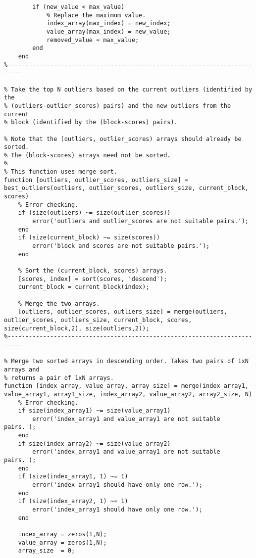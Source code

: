 \begin{lstlisting}
        if (new_value < max_value)
            % Replace the maximum value.
            index_array(max_index) = new_index;
            value_array(max_index) = new_value;
            removed_value = max_value;
        end
    end
%--------------------------------------------------------------------------

% Take the top N outliers based on the current outliers (identified by the
% (outliers-outlier_scores) pairs) and the new outliers from the current
% block (identified by the (block-scores) pairs).

% Note that the (outliers, outlier_scores) arrays should already be sorted.
% The (block-scores) arrays need not be sorted.
%
% This function uses merge sort.
function [outliers, outlier_scores, outliers_size] = best_outliers(outliers, outlier_scores, outliers_size, current_block, scores)
    % Error checking.
    if (size(outliers) ~= size(outlier_scores))
        error('outliers and outlier_scores are not suitable pairs.');
    end
    if (size(current_block) ~= size(scores))
        error('block and scores are not suitable pairs.');
    end

    % Sort the (current_block, scores) arrays.
    [scores, index] = sort(scores, 'descend');
    current_block = current_block(index);

    % Merge the two arrays.
    [outliers, outlier_scores, outliers_size] = merge(outliers, outlier_scores, outliers_size, current_block, scores, size(current_block,2), size(outliers,2));
%--------------------------------------------------------------------------

% Merge two sorted arrays in descending order. Takes two pairs of 1xN arrays and
% returns a pair of 1xN arrays.
function [index_array, value_array, array_size] = merge(index_array1, value_array1, array1_size, index_array2, value_array2, array2_size, N)
    % Error checking.
    if size(index_array1) ~= size(value_array1)
        error('index_array1 and value_array1 are not suitable pairs.');
    end
    if size(index_array2) ~= size(value_array2)
        error('index_array1 and value_array1 are not suitable pairs.');
    end
    if (size(index_array1, 1) ~= 1)
        error('index_array1 should have only one row.');
    end
    if (size(index_array2, 1) ~= 1)
        error('index_array1 should have only one row.');
    end

    index_array = zeros(1,N);
    value_array = zeros(1,N);
    array_size  = 0;


\end{lstlisting}

